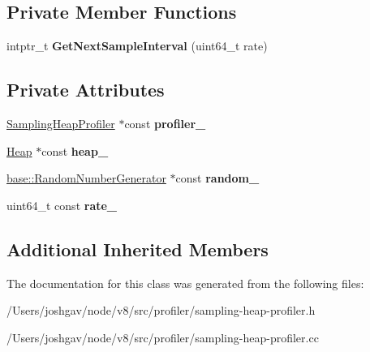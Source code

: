 \subsection*{Private Member Functions}
\begin{DoxyCompactItemize}
\item 
intptr\+\_\+t {\bfseries Get\+Next\+Sample\+Interval} (uint64\+\_\+t rate)\hypertarget{classv8_1_1internal_1_1_sampling_allocation_observer_a3361bcc3ae76ada04d721f083d2b2891}{}\label{classv8_1_1internal_1_1_sampling_allocation_observer_a3361bcc3ae76ada04d721f083d2b2891}

\end{DoxyCompactItemize}
\subsection*{Private Attributes}
\begin{DoxyCompactItemize}
\item 
\hyperlink{classv8_1_1internal_1_1_sampling_heap_profiler}{Sampling\+Heap\+Profiler} $\ast$const {\bfseries profiler\+\_\+}\hypertarget{classv8_1_1internal_1_1_sampling_allocation_observer_ad0f9e09a3ed9a522a9c0476b629d64b4}{}\label{classv8_1_1internal_1_1_sampling_allocation_observer_ad0f9e09a3ed9a522a9c0476b629d64b4}

\item 
\hyperlink{classv8_1_1internal_1_1_heap}{Heap} $\ast$const {\bfseries heap\+\_\+}\hypertarget{classv8_1_1internal_1_1_sampling_allocation_observer_af6a4b9d28ebf33fc1e1719c2d448cfe7}{}\label{classv8_1_1internal_1_1_sampling_allocation_observer_af6a4b9d28ebf33fc1e1719c2d448cfe7}

\item 
\hyperlink{classv8_1_1base_1_1_random_number_generator}{base\+::\+Random\+Number\+Generator} $\ast$const {\bfseries random\+\_\+}\hypertarget{classv8_1_1internal_1_1_sampling_allocation_observer_a11dc073a04f2642e1f24b18b9bb11dd7}{}\label{classv8_1_1internal_1_1_sampling_allocation_observer_a11dc073a04f2642e1f24b18b9bb11dd7}

\item 
uint64\+\_\+t const {\bfseries rate\+\_\+}\hypertarget{classv8_1_1internal_1_1_sampling_allocation_observer_a5bc12db72de20b66576482d8d8ed0176}{}\label{classv8_1_1internal_1_1_sampling_allocation_observer_a5bc12db72de20b66576482d8d8ed0176}

\end{DoxyCompactItemize}
\subsection*{Additional Inherited Members}


The documentation for this class was generated from the following files\+:\begin{DoxyCompactItemize}
\item 
/\+Users/joshgav/node/v8/src/profiler/sampling-\/heap-\/profiler.\+h\item 
/\+Users/joshgav/node/v8/src/profiler/sampling-\/heap-\/profiler.\+cc\end{DoxyCompactItemize}

